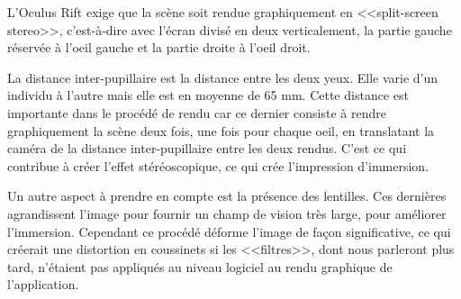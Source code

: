 \documentclass[a4paper,french,12pt]{article}
\begin{document}
			    L'Oculus Rift exige que la scène soit rendue graphiquement en <<split-screen stereo>>, 
			    c'est-à-dire avec l'écran divisé en deux verticalement, la partie gauche réservée à l'oeil gauche
			    et la partie droite à l'oeil droit.
			    
			    La distance inter-pupillaire est la distance entre les deux yeux. Elle varie d'un individu
			    à l'autre mais elle est en moyenne de 65 mm. Cette distance est importante dans le procédé 
			    de rendu car ce dernier consiste à rendre graphiquement la scène deux fois, une fois pour
			    chaque oeil, en translatant la caméra de la distance inter-pupillaire entre les deux rendus.
			    C'est ce qui contribue à créer l'effet stéréoscopique, ce qui crée l'impression d'immersion.
			
			    Un autre aspect à prendre en compte est la présence des lentilles. Ces dernières agrandissent
			    l'image pour fournir un champ de vision très large, pour améliorer l'immersion.
			    Cependant ce procédé déforme l'image de façon significative, ce qui créerait une distortion
			    en coussinets si les <<filtres>>, dont nous parleront plus tard,
			    n'étaient pas appliqués au niveau logiciel au rendu graphique de l'application.\\
			    
\end{document}
